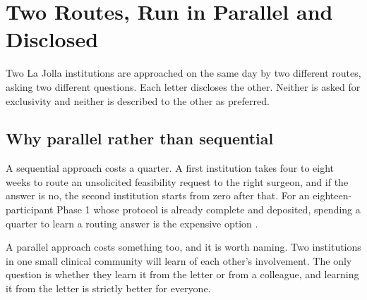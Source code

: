 \section{Two Routes, Run in Parallel and Disclosed}

Two La Jolla institutions are approached on the same day by two different routes,
asking two different questions. Each letter discloses the other. Neither is asked
for exclusivity and neither is described to the other as preferred.

\subsection{Why parallel rather than sequential}

A sequential approach costs a quarter. A first institution takes four to eight
weeks to route an unsolicited feasibility request to the right surgeon, and if
the answer is no, the second institution starts from zero after that. For an
eighteen-participant Phase 1 whose protocol is already complete and deposited,
spending a quarter to learn a routing answer is the expensive option
\cite{onpremwhippl}.

A parallel approach costs something too, and it is worth naming. Two institutions
in one small clinical community will learn of each other's involvement. The only
question is whether they learn it from the letter or from a colleague, and
learning it from the letter is strictly better for everyone.

